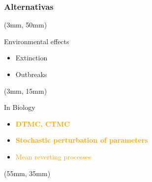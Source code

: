 \begin{frame}
    \frametitle{Alternativas}
    \begin{textblock*}{37mm}(3mm, 50mm)
        \begin{block}{Environmental effects}
            \begin{itemize}
                \item Extinction
                \item Outbreaks
            \end{itemize}
        \end{block}
    \end{textblock*}
    \begin{textblock*}{37mm}(3mm, 15mm)
        \begin{block}{In Biology}
            \begin{itemize}
                \item<1> \textcolor<1>{orange}{\textbf{DTMC, CTMC}}
                \item<2-3>\textcolor<2-3>{orange}{
                    \textbf<2-3>{%
                        Stochastic perturbation of parameters
                    }
                }
                \item<4> \textcolor<4>{orange}{Mean reverting processes}
            \end{itemize}
        \end{block}
    \end{textblock*}
    \begin{textblock*}{65mm}(55mm, 35mm)
        \begin{alertblock}{%
            }%
\end{alertblock}
\end{textblock*}
\end{frame}
